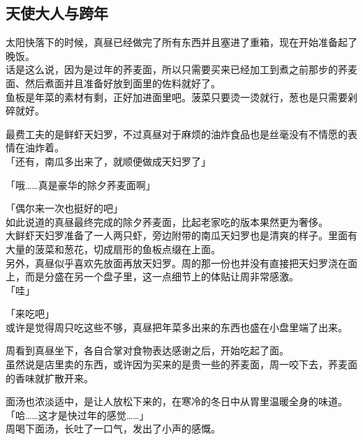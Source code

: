 \subsection{天使大人与跨年}

太阳快落下的时候，真昼已经做完了所有东西并且塞进了重箱，现在开始准备起了晚饭。\\

话是这么说，因为是过年的荞麦面，所以只需要买来已经加工到煮之前那步的荞麦面、然后煮面并且准备好放到面里的佐料就好了。\\

鱼板是年菜的素材有剩，正好加进面里吧。菠菜只要烫一烫就行，葱也是只需要剁碎就好。

最费工夫的是鲜虾天妇罗，不过真昼对于麻烦的油炸食品也是丝毫没有不情愿的表情在油炸着。\\

「还有，南瓜多出来了，就顺便做成天妇罗了」

「哦……真是豪华的除夕荞麦面啊」

「偶尔来一次也挺好的吧」\\

如此说道的真昼最终完成的除夕荞麦面，比起老家吃的版本果然更为奢侈。\\

大鲜虾天妇罗准备了一人两只虾，旁边附带的南瓜天妇罗也是清爽的样子。里面有大量的菠菜和葱花，切成扇形的鱼板点缀在上面。\\

另外，真昼似乎喜欢先放面再放天妇罗。周的那一份也并没有直接把天妇罗浇在面上，而是分盛在另一个盘子里，这一点细节上的体贴让周非常感激。\\

「哇」

「来吃吧」\\

或许是觉得周只吃这些不够，真昼把年菜多出来的东西也盛在小盘里端了出来。

周看到真昼坐下，各自合掌对食物表达感谢之后，开始吃起了面。\\

虽然说是店里卖的东西，或许因为买来的是贵一些的荞麦面，周一咬下去，荞麦面的香味就扩散开来。

面汤也浓淡适中，是让人放松下来的，在寒冷的冬日中从胃里温暖全身的味道。\\

「哈……这才是快过年的感觉……」\\

周喝下面汤，长吐了一口气，发出了小声的感慨。\\

